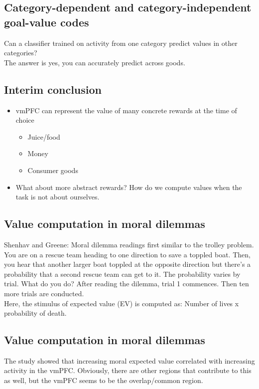 \subsection{Category-dependent and category-independent goal-value codes}
Can a classifier trained on activity from one category predict values in other categories?
\\The answer is yes, you can accurately predict across goods.
\subsection{Interim conclusion}
\begin{itemize}
    \item vmPFC can represent the value of many concrete rewards at the time of choice
    \begin{itemize}
        \item Juice/food
        \item Money
        \item Consumer goods
    \end{itemize}
    \item What about more abstract rewards? How do we compute values when the task is not about ourselves.
\end{itemize}
\subsection{Value computation in moral dilemmas}
Shenhav and Greene: Moral dilemma readings first similar to the trolley problem. You are on a rescue team heading to one direction to save a toppled boat. Then, you hear that another larger boat toppled at the opposite direction but there's a probability that a second rescue team can get to it. The probability varies by trial. What do you do? After reading the dilemma, trial 1 commences. Then ten more trials are conducted.
\\Here, the stimulus of expected value (EV) is computed as: Number of lives x probability of death. 
\subsection{Value computation in moral dilemmas}
The study showed that increasing moral expected value correlated with increasing activity in the vmPFC. Obviously, there are other regions that contribute to this as well, but the vmPFC seems to be the overlap/common  region.
